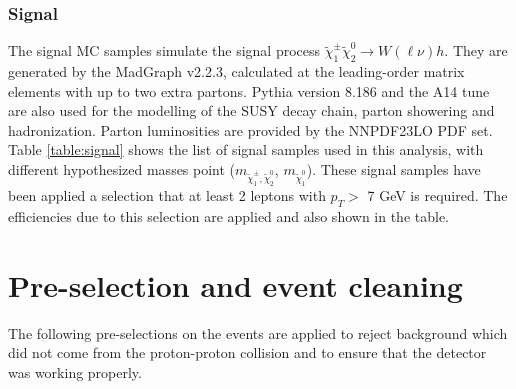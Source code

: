 \subsubsection{Signal}
The signal MC samples simulate the signal process $\tilde{\chi}_1^\pm \tilde{\chi}_2^0 \rightarrow W(\ell\nu)h$.
They are generated by the {\sc MadGraph} v2.2.3, calculated at the leading-order matrix elements with up to two extra partons.
{\sc Pythia} version 8.186 and the A14 tune are also used for the modelling of the SUSY decay chain, parton showering and hadronization.
Parton luminosities are provided by the NNPDF23LO PDF set.
Table \ref{table:signal} shows the list of signal samples used in this analysis, with different hypothesized masses point ($m_{\tilde{\chi}_1^\pm , \tilde{\chi}_2^0}$, $m_{\tilde{\chi}_1^0}$).
These signal samples have been applied a selection that at least 2 leptons with $p_{T} >$ 7 GeV is required.
The efficiencies due to this selection are applied and also shown in the table.

\section{Pre-selection and event cleaning}
\label{event_cleaning}
The following pre-selections on the events are applied to reject background which did not come from the proton-proton collision and to ensure that the detector was working properly.

